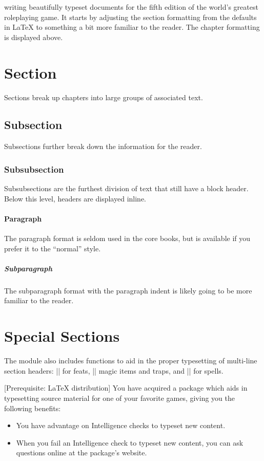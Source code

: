 \documentclass[letterpaper, twocolumn, openany, nodeprecatedcode, layout=true]{dndbook}
\begin{document}
 writing beautifully typeset documents for the fifth edition of the world's greatest roleplaying game. It starts by adjusting the section formatting from the defaults in \LaTeX{} to something a bit more familiar to the reader. The chapter formatting is displayed above.

\section{Section}
Sections break up chapters into large groups of associated text.

\subsection{Subsection}
Subsections further break down the information for the reader.

\subsubsection{Subsubsection}
Subsubsections are the furthest division of text that still have a block header. Below this level, headers are displayed inline.

\paragraph{Paragraph}
The paragraph format is seldom used in the core books, but is available if you prefer it to the ``normal'' style.

\subparagraph{Subparagraph}
The subparagraph format with the paragraph indent is likely going to be more familiar to the reader.

\section{Special Sections}
The module also includes functions to aid in the proper typesetting of multi-line section headers: |\DndFeatHeader| for feats, |\DndItemHeader| magic items and traps, and |\DndSpellHeader| for spells.

[Prerequisite: \LaTeX{} distribution]
You have acquired a package which aids in typesetting source material for one of your favorite games, giving you the following benefits:

\begin{itemize}
  \item You have advantage on Intelligence checks to typeset new content.
  \item When you fail an Intelligence check to typeset new content, you can ask questions online at the package's website.
\end{itemize}
\end{document}
